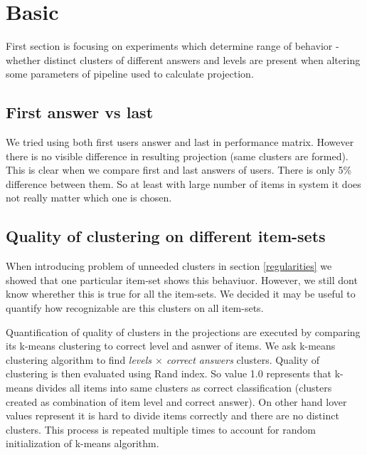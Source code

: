 \documentclass[
  digital, %
  table,   %
  nolof,     %
  nolot,     %
  nocover
]{fithesis3}
\begin{document}
\section{Basic}

First section is focusing on experiments which determine range of behavior - whether distinct clusters of different answers and levels are present when altering some parameters of pipeline used to calculate projection.

\subsection{First answer vs last}

We tried using both first users answer and last in performance matrix.
However there is no visible difference in resulting projection (same
clusters are formed). This is clear when we compare first and last
answers of users. There is only 5\% difference between them. So at least
with large number of items in system it does not really matter which one
is chosen.

\subsection{Quality of clustering on different item-sets}

When introducing problem of unneeded clusters in section \ref{regularities} we showed that one particular item-set shows this behaviuor. However, we still dont know wherether this is true for all the item-sets. We decided it may be useful to quantify how recognizable are this clusters on all item-sets.


Quantification of quality of clusters in the projections are executed by comparing its k-means clustering to correct level and asnwer of items. We ask k-means clustering algorithm to find \textit{levels $\times$ correct answers} clusters. Quality of clustering is then evaluated using Rand index. So value 1.0 represents that k-means divides all items into same clusters as correct classification (clusters created as combination of item level and correct answer). On other hand lover values represent it is hard to divide items correctly and there are no distinct clusters. This process is repeated multiple times to account for random initialization of k-means algorithm.
\end{document}
